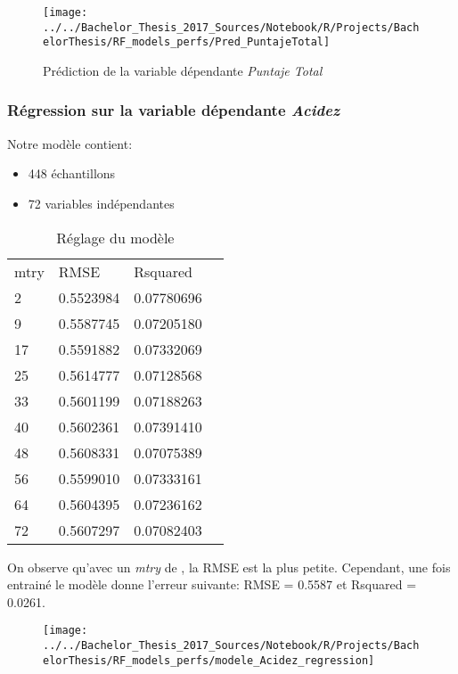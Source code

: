 \begin{figure}[H]
	\centering
	\texttt{[image: ../../Bachelor\_Thesis\_2017\_Sources/Notebook/R/Projects/BachelorThesis/RF\_models\_perfs/Pred\_PuntajeTotal]}
	\caption{Prédiction de la variable dépendante \textit{Puntaje Total}}
	\label{fig:predpuntajetotal}
\end{figure}





\newpage
\subsubsection{Régression sur la variable dépendante \textit{Acidez}}
\noindent Notre modèle contient: 
\begin{itemize}
	\item 448 échantillons
	\item 72 variables indépendantes
\end{itemize}


\begin{table}[H]
	\centering
	\caption{Réglage du modèle}
	\label{RF_Acidez_Resampling}
	\begin{tabular}{llll}
	    mtry & RMSE      & Rsquared   \\
	    2    & 0.5523984 & 0.07780696 \\
	    9    & 0.5587745 & 0.07205180 \\
	    17   & 0.5591882 & 0.07332069 \\
	    25   & 0.5614777 & 0.07128568 \\
	    33   & 0.5601199 & 0.07188263 \\
	    40   & 0.5602361 & 0.07391410 \\
	    48   & 0.5608331 & 0.07075389 \\
	    56   & 0.5599010 & 0.07333161 \\
	    64   & 0.5604395 & 0.07236162 \\
	    72   & 0.5607297 & 0.07082403
	\end{tabular}
\end{table}

\noindent On observe qu'avec un \textit{mtry} de , la RMSE est la plus petite. Cependant, une fois entrainé le modèle donne l'erreur suivante: RMSE = 0.5587  et Rsquared = 0.0261. 

\begin{figure}[H]
	\centering
	\texttt{[image: ../../Bachelor\_Thesis\_2017\_Sources/Notebook/R/Projects/BachelorThesis/RF\_models\_perfs/modele\_Acidez\_regression]}
	\caption{}
	\label{fig:modeleacidezregression}
\end{figure}


